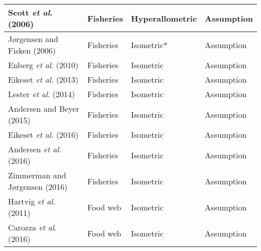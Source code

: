 \documentclass[a4paper]{article} %
\begin{document}
\begin{table}[H]
\begin{tabular}{|l|l|l|l|}
    Scott \textit{et al}. (2006)        & Fisheries                 & Hyperallometric  & Assumption                     \\ \hline
    Jørgensen and Fisken (2006)         & Fisheries                 & Isometric*       & Assumption                     \\ \hline
    Enberg \textit{et al}. (2010)       & Fisheries                 & Isometric        & Assumption                     \\ \hline
    Eikeset \textit{et al}. (2013)      & Fisheries                 & Isometric        & Assumption                     \\ \hline
    Lester \textit{et al}. (2014)       & Fisheries                 & Isometric        & Assumption                     \\ \hline
    Andersen and Beyer (2015)           & Fisheries                 & Isometric        & Assumption                     \\ \hline
    Eikeset \textit{et al}. (2016)      & Fisheries                 & Isometric        & Assumption                     \\ \hline
    Andersen \textit{et al}. (2016)     & Fisheries                 & Isometric        & Assumption                     \\ \hline
    Zimmerman and Jørgensen (2016)      & Fisheries                 & Isometric        & Assumption                     \\ \hline
    Hartvig \textit{et al}. (2011)      & Food web                  & Isometric        & Assumption                     \\ \hline
    Carozza \textit{et al}. (2016)      & Food web                  & Isometric        & Assumption                     \\ \hline
    \end{tabular}
\end{table}

\newpage{}

\let\mkbibnamefamily\textsc\printbibliography[title=SI Bibliography]\thispagestyle{empty} %
\end{document}
